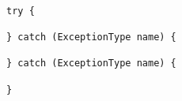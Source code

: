 \begin{lstlisting}

try {
     
} catch (ExceptionType name) {
     
} catch (ExceptionType name) {
     
}  

\end{lstlisting}


%

